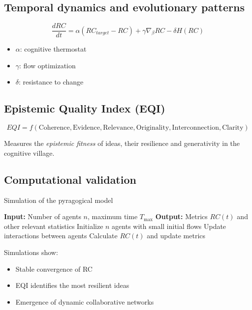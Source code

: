 \subsection{Temporal dynamics and evolutionary patterns}

\[
\frac{dRC}{dt} = \alpha (RC_{target}-RC) + \gamma \nabla_\beta RC - \delta H(RC)
\]

\begin{itemize}
	\item $\alpha$: cognitive thermostat
	\item $\gamma$: flow optimization
	\item $\delta$: resistance to change
\end{itemize}

\subsection{Epistemic Quality Index (EQI)}

\[
EQI = f(\text{Coherence}, \text{Evidence}, \text{Relevance}, \text{Originality}, \text{Interconnection}, \text{Clarity})
\]

Measures the \textit{epistemic fitness} of ideas, their resilience and generativity in the cognitive village.

\subsection{Computational validation}

\begin{algorithm}[H]
	\caption{Simulation of the pyragogical model}
	\label{alg:pyragogical-simulation}
	\begin{algorithmic}[1]
		\State \textbf{Input:} Number of agents $n$, maximum time $T_{\text{max}}$
		\State \textbf{Output:} Metrics $RC(t)$ and other relevant statistics
		\State Initialize $n$ agents with small initial flows
		\State Update interactions between agents 
		\State Calculate $RC(t)$ and update metrics
		\EndFor
	\end{algorithmic}
\end{algorithm}


\begin{tcolorbox}[title=Narrative Results, colback=gray!5!white]
	Simulations show:
	\begin{itemize}
		\item Stable convergence of RC
		\item EQI identifies the most resilient ideas
		\item Emergence of dynamic collaborative networks
	\end{itemize}
\end{tcolorbox}

